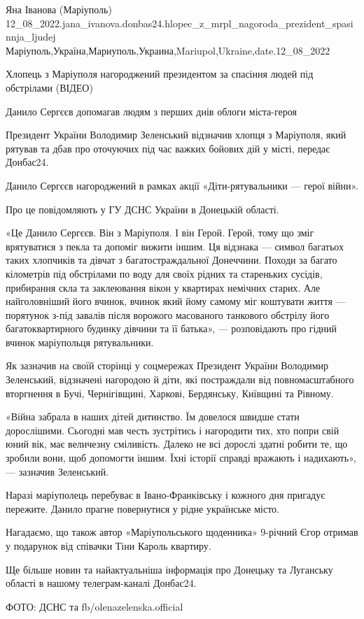  
 
 
 
 

Яна Іванова (Маріуполь)
12_08_2022.jana_ivanova.donbas24.hlopec_z_mrpl_nagoroda_prezident_spasinnja_ljudej
Маріуполь,Україна,Мариуполь,Украина,Mariupol,Ukraine,date.12_08_2022

Хлопець з Маріуполя нагороджений президентом за спасіння людей під обстрілами
(ВІДЕО)

Данило Сергєєв допомагав людям з перших днів облоги міста-героя

Президент України Володимир Зеленський відзначив хлопця з Маріуполя, який
рятував та дбав про оточуючих під час важких бойових дій у місті, передає
Донбас24.

Данило Сергєєв нагороджений в рамках акції «Діти-рятувальники — герої війни».

Про це повідомляють у ГУ ДСНС України в Донецькій області.

«Це Данило Сергєєв. Він з Маріуполя. І він Герой. Герой, тому що зміг
врятуватися з пекла та допоміг вижити іншим. Ця відзнака — символ багатьох
таких хлопчиків та дівчат з багатостраждальної Донеччини. Походи за багато
кілометрів під обстрілами по воду для своїх рідних та стареньких сусідів,
прибирання скла та заклеювання вікон у квартирах немічних старих. Але
найголовніший його вчинок, вчинок який йому самому міг коштувати життя —
порятунок з-під завалів після ворожого масованого танкового обстрілу його
багатоквартирного будинку дівчини та її батька», — розповідають про гідний
вчинок маріупольця рятувальники.

Як зазначив на своїй сторінці у соцмережах Президент України Володимир
Зеленський, відзначені нагородою й діти, які постраждали від повномасштабного
вторгнення в Бучі, Чернігівщині, Харкові, Бердянську, Київщині та Рівному.

«Війна забрала в наших дітей дитинство. Їм довелося швидше стати дорослішими.
Сьогодні мав честь зустрітись і нагородити тих, хто попри свій юний вік, має
величезну сміливість. Далеко не всі дорослі здатні робити те, що зробили вони,
щоб допомогти іншим. Їхні історії справді вражають і надихають», — зазначив
Зеленський.

Наразі маріуполець перебуває в Івано-Франківську і кожного дня пригадує
пережите. Данило прагне повернутися у рідне українське місто.

Нагадаємо, що також автор «Маріупольського щоденника» 9-річний Єгор отримав у
подарунок від співачки Тіни Кароль квартиру.

Ще більше новин та найактуальніша інформація про Донецьку та Луганську області
в нашому телеграм-каналі Донбас24.

ФОТО: ДСНС та fb/olenazelenska.official

